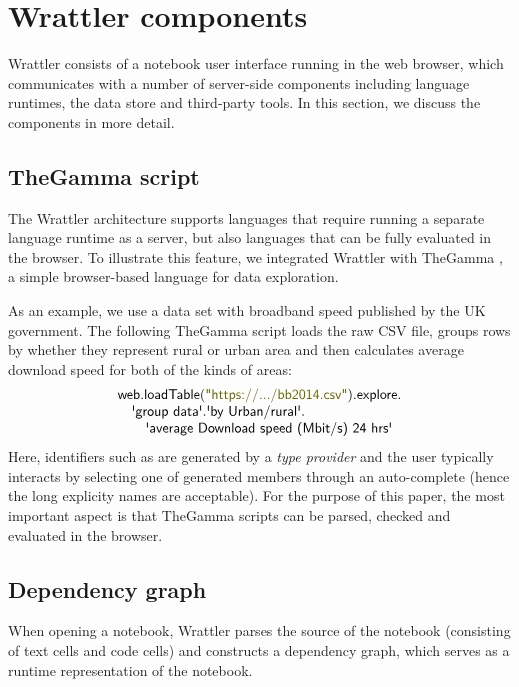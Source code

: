 \documentclass[sigplan]{acmart}\settopmatter{printfolios=true,printccs=false,printacmref=false}
\begin{document}
\section{Wrattler components}
\label{sec:comp}

Wrattler consists of a notebook user interface running in the web browser, which communicates 
with a number of server-side components including language runtimes, the data store and third-party 
tools. In this section, we discuss the components in more detail.

\subsection{TheGamma script}
\label{sec:comp-gamma}

The Wrattler architecture supports languages that require running a separate language runtime
as a server, but also languages that can be fully evaluated in the browser. To illustrate this
feature, we integrated Wrattler with TheGamma \cite{thegamma}, a simple browser-based language for data
exploration.

As an example, we use a data set with broadband speed published by the UK government.
The following TheGamma script loads the raw CSV file, groups rows by whether they represent
rural or urban area and then calculates average download speed for both of the kinds of areas:
%
\begin{equation*}
\begin{array}{l}
\ident{web.loadTable}(\str{https://.../bb2014.csv}).\ident{explore}.\\
\quad\qident{group data}.\qident{by Urban/rural}.\\
\qquad\qident{average Download speed (Mbit/s) 24 hrs}  
\end{array}
\end{equation*}
%
Here, identifiers such as  are generated by a \emph{type provider} \cite{providers} 
and the user typically interacts by selecting one of generated members through an auto-complete
(hence the long explicity names are acceptable). For the purpose of this paper, the most 
important aspect is that TheGamma scripts can be parsed, checked and evaluated in the browser.

\subsection{Dependency graph}
\label{sec:comp-deps}

When opening a notebook, Wrattler parses the source of the notebook (consisting of text cells and
code cells) and constructs a dependency graph, which serves as a runtime representation of the
notebook. 
\end{document}
